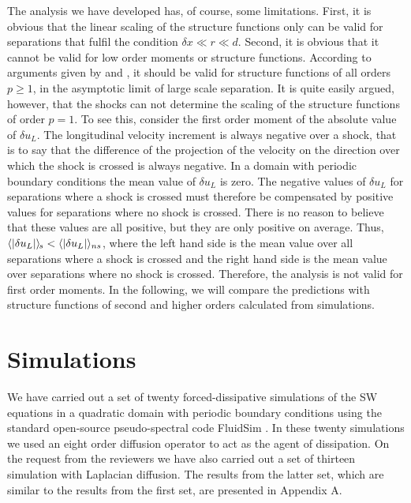 \documentclass{jfm}
\let\ge=\geqslant  \let\geq=\geqslant
\newcommand{\means}[1]{{\langle #1 \rangle_{\hspace{-0.4mm}s}}}
\begin{document}
The analysis we have developed has, of course, some limitations. First, it is obvious that  the linear scaling of the structure functions only can be valid for separations  that fulfil the condition $ \delta x \ll r \ll d $.  Second, it is obvious that it  cannot be valid for low order moments or structure functions. According to arguments given by  \cite{BouchaudMezardParisi1995}  and \cite{Weinan}, it should be valid for structure functions of all orders $ p  \ge 1 $, in the asymptotic limit of large scale separation.  It is quite easily argued, however, that the shocks can not determine the scaling of the structure functions of order $ p=1 $. 
To see this, consider the first order moment of the absolute value of $ \delta u_L $. 
The longitudinal velocity increment is always negative over a shock, that is to say that the difference of the projection of the velocity on the direction over which the shock is crossed is always negative. In a domain with periodic boundary conditions the mean value of $ \delta u_L $   is zero. The negative values of $ \delta u_L $ for separations where a shock is crossed must therefore be compensated by positive values for separations where no shock is crossed. There is no reason to believe that these values are all positive,  but they are only positive on average. Thus, 
$ \means{ |\delta u_L | } < \langle | \delta u_L | \rangle _{ns} $, where the left hand side is the mean value over all separations where a shock is crossed and the right hand side is the mean value over separations where no shock is crossed.  Therefore, the analysis is not valid for first order moments. In the following, we will compare the predictions with structure functions of second and higher orders calculated from simulations. 









\section{Simulations}

We have carried out a set of twenty forced-dissipative simulations of the SW
equations in a quadratic domain with periodic boundary conditions using the
standard open-source pseudo-spectral code FluidSim \cite[]{fluiddyn, fluidfft,
fluidsim}. In these twenty simulations we used an eight order diffusion operator to act as the agent of dissipation. 
 On the request from the reviewers we have also carried out a set of thirteen simulation with  Laplacian diffusion. The results from the latter set, which are similar to the results from the first set,  are presented in Appendix A.
\end{document}
